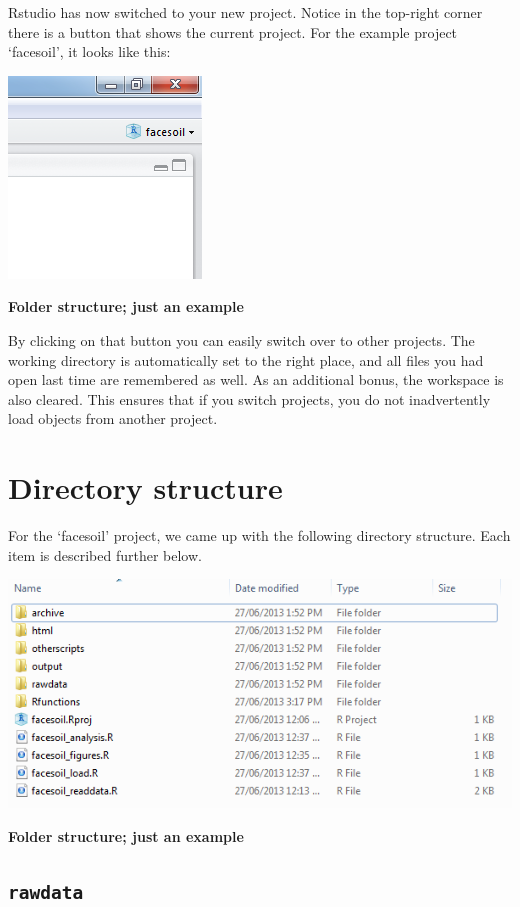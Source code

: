 \documentclass[]{book}
\begin{document}
Rstudio has now switched to your new project. Notice in the top-right corner there is a button that shows the current project. For the example project `facesoil', it looks like this:

\includegraphics[width=0.3\linewidth]{screenshots/projectbutton}

\textbf{Folder structure; just an example}

By clicking on that button you can easily switch over to other projects. The working directory is automatically set to the right place, and all files you had open last time are remembered as well. As an additional bonus, the workspace is also cleared. This ensures that if you switch projects, you do not inadvertently load objects from another project.

\hypertarget{directory-structure}{%
\section{Directory structure}\label{directory-structure}}

For the `facesoil' project, we came up with the following directory structure. Each item is described further below.

\includegraphics[width=0.7\linewidth]{screenshots/folderstructure}

\textbf{Folder structure; just an example}

\hypertarget{rawdata}{%
\subsection{\texorpdfstring{\texttt{rawdata}}{rawdata}}\label{rawdata}}
\end{document}
